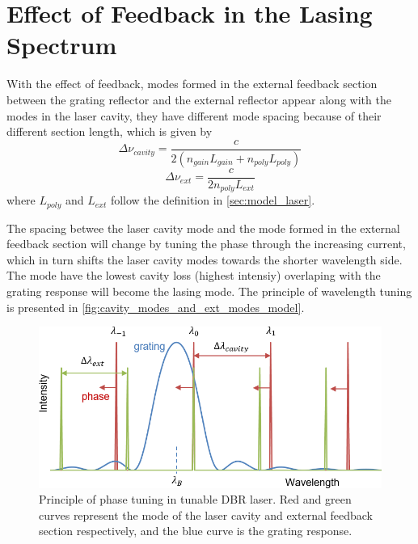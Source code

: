 \section{Effect of Feedback in the Lasing Spectrum}\label{sec:feedback_influenced_lasing_spectral_behavior}
With the effect of feedback, modes formed in the external feedback section between the grating reflector and the external reflector appear along with the modes in the laser cavity, they have different mode spacing because of their different section length, which is given by \cite{coldren2012diode}
\begin{equation}
    \Delta\nu_{cavity}=\frac{c}{2(n_{gain}L_{gain}+n_{poly}L_{poly})}
    \label{eq:mode_spacing_laser_cavity}
\end{equation}
\begin{equation}
    \Delta\nu_{ext}=\frac{c}{2n_{poly}L_{ext}}
    \label{eq:mode_spacing_external}
\end{equation}
where $L_{poly}$ and $L_{ext}$ follow the definition in \autoref{sec:model_laser}.

The spacing betwee the laser cavity mode and the mode formed in the external feedback section will change by tuning the phase through the increasing current, which in turn shifts the laser cavity modes towards the shorter wavelength side. The mode have the lowest cavity loss (highest intensiy) overlaping with the grating response will become the lasing mode. The principle of wavelength tuning is presented in \autoref{fig:cavity_modes_and_ext_modes_model}.

\begin{figure}[ht]
    \centering
    \includegraphics[width=.7\linewidth]{figures/cavity_modes_and_ext_modes_model.png}
    \caption{Principle of phase tuning in tunable DBR laser. Red and green curves represent the mode of the laser cavity and external feedback section respectively, and the blue curve is the grating response. }
    \label{fig:cavity_modes_and_ext_modes_model}
\end{figure}

